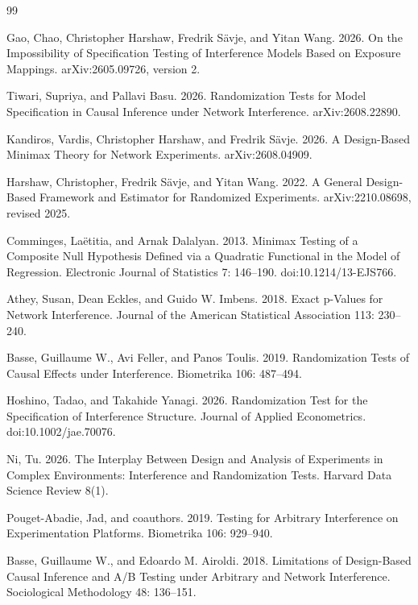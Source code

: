 \documentclass{article}
\begin{document}
\begin{thebibliography}{99}

   Gao, Chao, Christopher Harshaw, Fredrik Sävje, and Yitan Wang. 2026. On the Impossibility of Specification Testing of Interference Models Based on Exposure Mappings. arXiv:2605.09726, version 2.

   Tiwari, Supriya, and Pallavi Basu. 2026. Randomization Tests for Model Specification in Causal Inference under Network Interference. arXiv:2608.22890.

   Kandiros, Vardis, Christopher Harshaw, and Fredrik Sävje. 2026. A Design-Based Minimax Theory for Network Experiments. arXiv:2608.04909.

   Harshaw, Christopher, Fredrik Sävje, and Yitan Wang. 2022. A General Design-Based Framework and Estimator for Randomized Experiments. arXiv:2210.08698, revised 2025.

   Comminges, Laëtitia, and Arnak Dalalyan. 2013. Minimax Testing of a Composite Null Hypothesis Defined via a Quadratic Functional in the Model of Regression. Electronic Journal of Statistics 7: 146--190. doi:10.1214/13-EJS766.

   Athey, Susan, Dean Eckles, and Guido W. Imbens. 2018. Exact p-Values for Network Interference. Journal of the American Statistical Association 113: 230--240.

   Basse, Guillaume W., Avi Feller, and Panos Toulis. 2019. Randomization Tests of Causal Effects under Interference. Biometrika 106: 487--494.

   Hoshino, Tadao, and Takahide Yanagi. 2026. Randomization Test for the Specification of Interference Structure. Journal of Applied Econometrics. doi:10.1002/jae.70076.

   Ni, Tu. 2026. The Interplay Between Design and Analysis of Experiments in Complex Environments: Interference and Randomization Tests. Harvard Data Science Review 8(1).

   Pouget-Abadie, Jad, and coauthors. 2019. Testing for Arbitrary Interference on Experimentation Platforms. Biometrika 106: 929--940.

   Basse, Guillaume W., and Edoardo M. Airoldi. 2018. Limitations of Design-Based Causal Inference and A/B Testing under Arbitrary and Network Interference. Sociological Methodology 48: 136--151.

\end{thebibliography}
\end{document}
